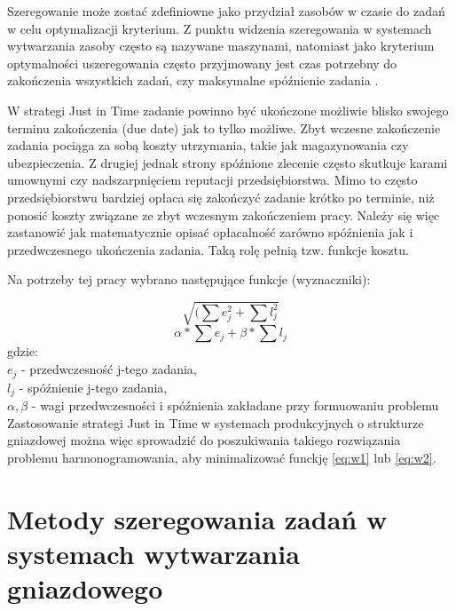 \documentclass[twoside]{kInzynierka}
\begin{document}
Szeregowanie może zostać zdefiniowne jako przydział zasobów w czasie do zadań w celu optymalizacji kryterium. Z punktu widzenia szeregowania w systemach wytwarzania zasoby często są nazywane maszynami, natomiast jako kryterium optymalności uszeregowania często przyjmowany jest czas potrzebny do zakończenia wszystkich zadań, czy maksymalne spóźnienie zadania \cite{antColony}.

W strategi Just in Time zadanie powinno być ukończone możliwie blisko swojego terminu zakończenia (due date) jak to tylko możliwe. Zbyt wczesne zakończenie zadania pociąga za sobą koszty utrzymania, takie jak magazynowania czy ubezpieczenia. Z drugiej jednak strony spóźnione zlecenie często skutkuje karami umownymi czy nadszarpnięciem reputacji przedsiębiorstwa. Mimo to często przedsiębiorstwu bardziej opłaca się zakończyć zadanie krótko po terminie, niż ponosić koszty związane ze zbyt wczesnym zakończeniem pracy. Należy się więc zastanowić jak matematycznie opisać opłacalność zarówno spóźnienia jak i przedwczesnego ukończenia zadania. Taką rolę pełnią tzw. funkcje kosztu.%

Na potrzeby tej pracy wybrano następujące funkcje (wyznaczniki):

\begin{equation}
    \sqrt{(\sum e_j^2 + \sum l_j^2}
    \label{eq:w1}
\end{equation}
\begin{equation}
    \alpha*\sum e_j + \beta*\sum l_j
    \label{eq:w2}
\end{equation}
gdzie: \\
\(e_j\) - przedwczesność j-tego zadania, \\
\(l_j\) - spóźnienie j-tego zadania, \\
\(\alpha, \beta\) - wagi przedwczesności i spóźnienia zakładane przy formuowaniu problemu\\

Zastosowanie strategi Just in Time w systemach produkcyjnych o strukturze gniazdowej można więc sprowadzić do poszukiwania takiego rozwiązania problemu harmonogramowania, aby minimalizować funckję \ref{eq:w1} lub \ref{eq:w2}.

\section       [Metody szeregowania zadań \ldots]
		        {Metody szeregowania zadań \newline w systemach wytwarzania gniazdowego}
\end{document}
